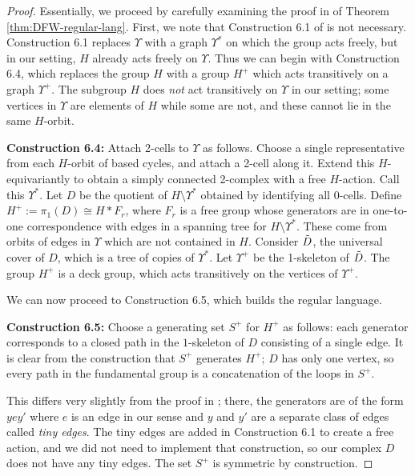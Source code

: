 \documentclass[10pt,a4paper]{amsart}
\begin{document}
    \begin{proof}
        Essentially, we proceed by carefully examining the proof in \cite{DFW} of Theorem \ref{thm:DFW-regular-lang}. First, we note that Construction 6.1 of \cite{DFW} is not necessary. Construction 6.1 replaces $\Upsilon$ with a graph $\Upsilon^{*}$ on which the group acts freely, but in our setting, $H$ already acts freely on $\Upsilon$. Thus we can begin with Construction 6.4, which replaces the group $H$ with a group $H^{+}$ which acts transitively on a graph $\Upsilon^{+}$. The subgroup $H$ does \emph{not} act transitively on $\Upsilon$ in our setting; some vertices in $\Upsilon$ are elements of $H$ while some are not, and these cannot lie in the same $H$-orbit.

        \textbf{Construction 6.4:} Attach 2-cells to $\Upsilon$ as follows. Choose a single representative from each $H$-orbit of based cycles, and attach a 2-cell along it. Extend this $H$-equivariantly to obtain a simply connected 2-complex with a free $H$-action. Call this $\Upsilon^{*}$. Let $D$ be the quotient of $H \setminus \Upsilon^{*}$ obtained by identifying all 0-cells. Define $H^{+} := \pi_1(D) \cong H * F_r$, where $F_r$ is a free group whose generators are in one-to-one correspondence with edges in a spanning tree for $H \setminus \Upsilon^{*}$. These come from orbits of edges in $\Upsilon$ which are not contained in $H$. Consider $\Tilde{D}$, the universal cover of $D$, which is a tree of copies of $\Upsilon^{*}$. Let $\Upsilon^{+}$ be the 1-skeleton of $\Tilde{D}$. The group $H^{+}$ is a deck group, which acts transitively on the vertices of $\Upsilon^{+}$.

        We can now proceed to Construction 6.5, which builds the regular language. 

        \textbf{Construction 6.5:} Choose a generating set $S^{+}$ for $H^{+}$ as follows: each generator corresponds to a closed path in the $1$-skeleton of $D$ consisting of a single edge. It is clear from the construction that $S^{+}$ generates $H^{+}$; $D$ has only one vertex, so every path in the fundamental group is a concatenation of the loops in $S^{+}$.
        
        This differs very slightly from the proof in \cite{DFW}; there, the generators are of the form $y e y'$ where $e$ is an edge in our sense and $y$ and $y'$ are a separate class of edges called \emph{tiny edges}. The tiny edges are added in Construction 6.1 to create a free action, and we did not need to implement that construction, so our complex $D$ does not have any tiny edges. The set $S^{+}$ is symmetric by construction.


\end{proof}
\end{document}
